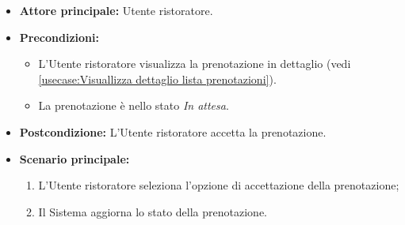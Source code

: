 \label{usecase:Accetta prenotazione}
\begin{itemize}
	\item \textbf{Attore principale:} Utente ristoratore.

	\item \textbf{Precondizioni:}
	      \begin{itemize}
		      \item L'Utente ristoratore visualizza la prenotazione in dettaglio (vedi \autoref{usecase:Visuallizza dettaglio lista prenotazioni}).
		      \item La prenotazione è nello stato \textit{In attesa}.
	      \end{itemize}

	\item \textbf{Postcondizione:} L'Utente ristoratore accetta la prenotazione.


	\item \textbf{Scenario principale:}
	      \begin{enumerate}
		      \item L'Utente ristoratore seleziona l'opzione di accettazione della prenotazione;

		      \item Il Sistema aggiorna lo stato della prenotazione.
	      \end{enumerate}
\end{itemize}
